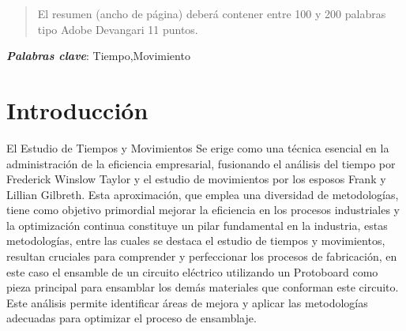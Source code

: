     \maketitle
    \thispagestyle{fancy}
    
    
    
    \begin{abstract}
    \noindent 
    El resumen (ancho de página) deberá contener entre 100 y 200 palabras tipo Adobe Devangari 11 puntos.
    
    \end{abstract}
    \textbf{\textit{Palabras clave}}:
    Tiempo,Movimiento
          
    
    \section{Introducción}
    El Estudio de Tiempos y Movimientos Se erige como una técnica esencial en la administración de la eficiencia empresarial, fusionando el análisis del tiempo por Frederick Winslow Taylor y el estudio de movimientos por los esposos Frank y Lillian Gilbreth. Esta aproximación, que emplea una diversidad de metodologías, tiene como objetivo primordial mejorar la eficiencia en los procesos industriales y la optimización continua constituye un pilar fundamental en la industria, estas metodologías, entre las cuales se destaca el estudio de tiempos y movimientos, resultan cruciales para comprender y perfeccionar los procesos de fabricación, en este caso el ensamble de un circuito eléctrico utilizando un Protoboard como pieza principal para ensamblar los demás materiales que conforman este circuito. Este análisis permite identificar áreas de mejora y aplicar las metodologías adecuadas para optimizar el proceso de ensamblaje.
    
